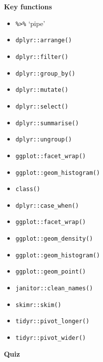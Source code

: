 \documentclass[
]{book}
\providecommand{\tightlist}{%
  \setlength{\itemsep}{0pt}\setlength{\parskip}{0pt}}
\begin{document}
\textbf{Key functions}

\begin{itemize}
\tightlist
\item
  \texttt{\%\textgreater{}\%} `pipe'
\item
  \texttt{dplyr::arrange()}
\item
  \texttt{dplyr::filter()}
\item
  \texttt{dplyr::group\_by()}
\item
  \texttt{dplyr::mutate()}
\item
  \texttt{dplyr::select()}
\item
  \texttt{dplyr::summarise()}
\item
  \texttt{dplyr::ungroup()}
\item
  \texttt{ggplot::facet\_wrap()}
\item
  \texttt{ggplot::geom\_histogram()}
\item
  \texttt{class()}
\item
  \texttt{dplyr::case\_when()}
\item
  \texttt{ggplot::facet\_wrap()}
\item
  \texttt{ggplot::geom\_density()}
\item
  \texttt{ggplot::geom\_histogram()}
\item
  \texttt{ggplot::geom\_point()}
\item
  \texttt{janitor::clean\_names()}
\item
  \texttt{skimr::skim()}
\item
  \texttt{tidyr::pivot\_longer()}
\item
  \texttt{tidyr::pivot\_wider()}
\end{itemize}

\textbf{Quiz}
\end{document}

